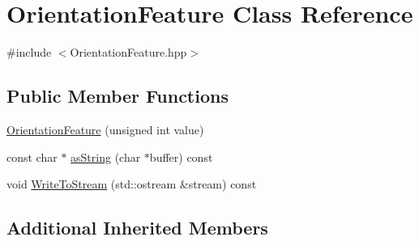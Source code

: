 \hypertarget{class_orientation_feature}{\section{Orientation\+Feature Class Reference}
\label{class_orientation_feature}
}


{\ttfamily \#include $<$Orientation\+Feature.\+hpp$>$}

\subsection*{Public Member Functions}
\begin{DoxyCompactItemize}
\item 
\hyperlink{class_orientation_feature_a314e2759927f7c3c625e298ab1f7e244}{Orientation\+Feature} (unsigned int value)
\item 
const char $\ast$ \hyperlink{class_orientation_feature_a181ee73c51e33108e21a52c6b95e81e7}{as\+String} (char $\ast$buffer) const 
\item 
void \hyperlink{class_orientation_feature_ac0c992dc7d54fc6e4558046142ddb881}{Write\+To\+Stream} (std\+::ostream \&stream) const 
\end{DoxyCompactItemize}
\subsection*{Additional Inherited Members}


